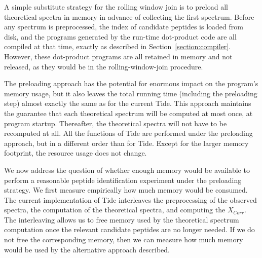 \documentclass[12pt,twoside,openright]{report}
\newcommand{\XCorr}{\ensuremath{X_{Corr}}\xspace}
\begin{document}
A simple substitute strategy for the rolling window join is to preload all
theoretical spectra in memory in advance of collecting the first
spectrum. Before any spectrum is preprocessed, the index of candidate peptides
is loaded from disk, and the programs generated by the run-time dot-product code
are all compiled at that time, exactly as described in
Section~\ref{section:compiler}. However, these dot-product programs are all
retained in memory and not released, as they would be in the rolling-window-join
procedure.

The preloading approach has the potential for enormous impact on the program's
memory usage, but it also leaves the total running time (including the
preloading step) almost exactly the same as for the current Tide. This approach
maintains the guarantee that each theoretical spectrum will be computed at most
once, at program startup. Thereafter, the theoretical spectra will not have to
be recomputed at all. All the functions of Tide are performed under the
preloading approach, but in a different order than for Tide. Except for the
larger memory footprint, the resource usage does not change.

We now address the question of whether enough memory would be available to
perform a reasonable peptide identification experiment under the preloading
strategy. We first measure empirically how much memory would be consumed. The
current implementation of Tide interleaves the preprocessing of the observed
spectra, the computation of the theoretical spectra, and computing the
\XCorr. The interleaving allows us to free memory used by the theoretical
spectrum computation once the relevant candidate peptides are no longer
needed. If we do not free the corresponding memory, then we can measure how much
memory would be used by the alternative approach described.
\end{document}
